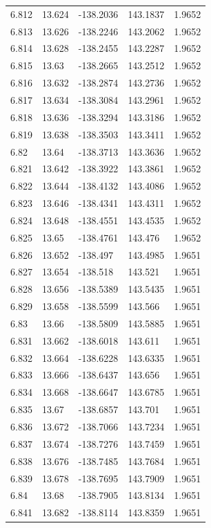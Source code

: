 \begin{tabular}{lllll}
6.812 & 13.624 & -138.2036 & 143.1837 & 1.9652 \\
6.813 & 13.626 & -138.2246 & 143.2062 & 1.9652 \\
6.814 & 13.628 & -138.2455 & 143.2287 & 1.9652 \\
6.815 & 13.63 & -138.2665 & 143.2512 & 1.9652 \\
6.816 & 13.632 & -138.2874 & 143.2736 & 1.9652 \\
6.817 & 13.634 & -138.3084 & 143.2961 & 1.9652 \\
6.818 & 13.636 & -138.3294 & 143.3186 & 1.9652 \\
6.819 & 13.638 & -138.3503 & 143.3411 & 1.9652 \\
6.82 & 13.64 & -138.3713 & 143.3636 & 1.9652 \\
6.821 & 13.642 & -138.3922 & 143.3861 & 1.9652 \\
6.822 & 13.644 & -138.4132 & 143.4086 & 1.9652 \\
6.823 & 13.646 & -138.4341 & 143.4311 & 1.9652 \\
6.824 & 13.648 & -138.4551 & 143.4535 & 1.9652 \\
6.825 & 13.65 & -138.4761 & 143.476 & 1.9652 \\
6.826 & 13.652 & -138.497 & 143.4985 & 1.9651 \\
6.827 & 13.654 & -138.518 & 143.521 & 1.9651 \\
6.828 & 13.656 & -138.5389 & 143.5435 & 1.9651 \\
6.829 & 13.658 & -138.5599 & 143.566 & 1.9651 \\
6.83 & 13.66 & -138.5809 & 143.5885 & 1.9651 \\
6.831 & 13.662 & -138.6018 & 143.611 & 1.9651 \\
6.832 & 13.664 & -138.6228 & 143.6335 & 1.9651 \\
6.833 & 13.666 & -138.6437 & 143.656 & 1.9651 \\
6.834 & 13.668 & -138.6647 & 143.6785 & 1.9651 \\
6.835 & 13.67 & -138.6857 & 143.701 & 1.9651 \\
6.836 & 13.672 & -138.7066 & 143.7234 & 1.9651 \\
6.837 & 13.674 & -138.7276 & 143.7459 & 1.9651 \\
6.838 & 13.676 & -138.7485 & 143.7684 & 1.9651 \\
6.839 & 13.678 & -138.7695 & 143.7909 & 1.9651 \\
6.84 & 13.68 & -138.7905 & 143.8134 & 1.9651 \\
6.841 & 13.682 & -138.8114 & 143.8359 & 1.9651 \\

\end{tabular}
